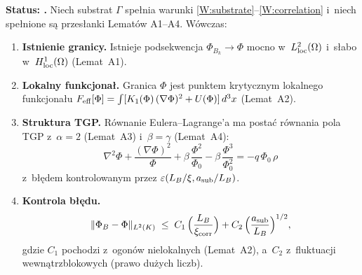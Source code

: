 \begin{proposition}%
\label{thm:A5-weak-continuum}
\textbf{Status: .}
Niech substrat $\Gamma$ spe\l{}nia warunki \ref{W:substrate}--\ref{W:correlation}
i~niech spe\l{}nione s\k{a} przes\l{}anki Lemat\'ow A1--A4.
W\'owczas:

\begin{enumerate}[nosep]
  \item \textbf{Istnienie granicy.}
    Istnieje podsekwencja $\Phi_{B_k} \to \Phi$ mocno w~$L^2_{\rm loc}(\Omega)$
    i~s\l{}abo w~$H^1_{\rm loc}(\Omega)$ (Lemat~A1).

  \item \textbf{Lokalny funkcjona\l{}.}
    Granica $\Phi$ jest punktem krytycznym lokalnego funkcjona\l{}u
    $F_{\rm eff}[\Phi] = \int [K_1(\Phi)\,(\nabla\Phi)^2 + U(\Phi)]\,d^3x$
    (Lemat~A2).

  \item \textbf{Struktura TGP.}
    R\'ownanie Eulera--Lagrange'a ma posta\'c r\'ownania pola TGP
    z~$\alpha = 2$ (Lemat~A3) i~$\beta = \gamma$ (Lemat~A4):
    \begin{equation}
      \boxed{
        \nabla^2\Phi + \frac{(\nabla\Phi)^2}{\Phi}
        + \beta\,\frac{\Phi^2}{\Phi_0}
        - \beta\,\frac{\Phi^3}{\Phi_0^2}
        = -q\,\Phi_0\,\rho
      }
      \label{eq:A5-TGP-recovered}
    \end{equation}
    z~b\l{}\k{e}dem kontrolowanym przez $\varepsilon(L_B/\xi, a_{\rm sub}/L_B)$.

  \item \textbf{Kontrola b\l{}\k{e}du.}
    \begin{equation}
      \|\Phi_B - \Phi\|_{L^2(K)}
      \;\le\; C_1\,\Bigl(\frac{L_B}{\xi_{\rm corr}}\Bigr)
        + C_2\,\Bigl(\frac{a_{\rm sub}}{L_B}\Bigr)^{1/2},
      \label{eq:A5-error}
    \end{equation}
    gdzie $C_1$ pochodzi z~ogon\'ow nielokalnych (Lemat~A2),
    a~$C_2$ z~fluktuacji wewn\k{a}trzblokowych (prawo du\.zych liczb).
\end{enumerate}
\end{proposition}


